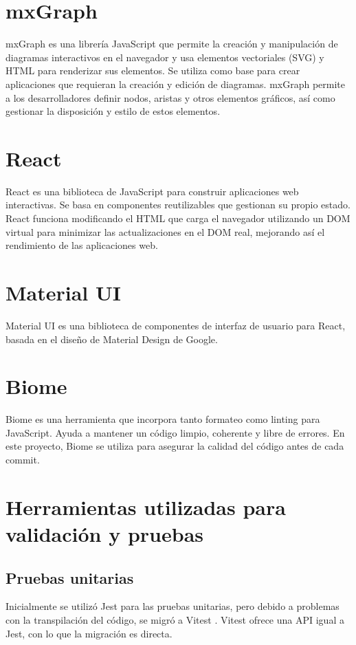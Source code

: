 
\section{mxGraph}
mxGraph \cite{mxgraph} es una librería JavaScript que permite la creación y manipulación de diagramas interactivos en el navegador y usa elementos vectoriales (SVG) y HTML para renderizar sus elementos. Se utiliza como base para crear aplicaciones que requieran la creación y edición de diagramas. mxGraph permite a los desarrolladores definir nodos, aristas y otros elementos gráficos, así como gestionar la disposición y estilo de estos elementos.

\section{React}
React \cite{react} es una biblioteca de JavaScript para construir aplicaciones web interactivas. Se basa en componentes reutilizables que gestionan su propio estado. React funciona modificando el HTML que carga el navegador utilizando un DOM virtual para minimizar las actualizaciones en el DOM real, mejorando así el rendimiento de las aplicaciones web.

\section{Material UI}
Material UI \cite{material-ui} es una biblioteca de componentes de interfaz de usuario para React, basada en el diseño de Material Design de Google.

\section{Biome}
Biome \cite{biome} es una herramienta que incorpora tanto formateo como linting para JavaScript. Ayuda a mantener un código limpio, coherente y libre de errores. En este proyecto, Biome se utiliza para asegurar la calidad del código antes de cada commit.

\section{Herramientas utilizadas para validación y pruebas}

\subsection{Pruebas unitarias}
Inicialmente se utilizó Jest \cite{jest} para las pruebas unitarias, pero debido a problemas con la transpilación del código, se migró a Vitest \cite{vitest}. Vitest ofrece una API igual a Jest, con lo que la migración es directa.

